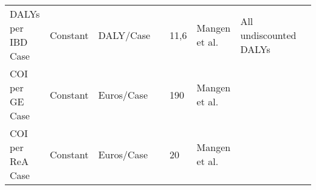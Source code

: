 \begin{landscape}
\begin{longtable}[c]{m{10em}lllm{15em}lll}
DALYs per IBD Case                            & Constant & DALY/Case                &                           & 11,6                                                                                                                                                                                                                                                                                     & Mangen et al.                                                                                                                                                                                & All undiscounted DALYs                                                                                                                                                                                                                \\
COI per GE Case                               & Constant & Euros/Case               &                           & 190                                                                                                                                                                                                                                                                                      & Mangen et al.                                                                                                                                                                                &                                                                                                                                                                                                                                       \\
COI per ReA Case                              & Constant & Euros/Case               &                           & 20                                                                                                                                                                                                                                                                                       & Mangen et al.                                                                                                                                                                                &                                                                                                                                                                                                                                       \\

\end{longtable}
\end{landscape}
